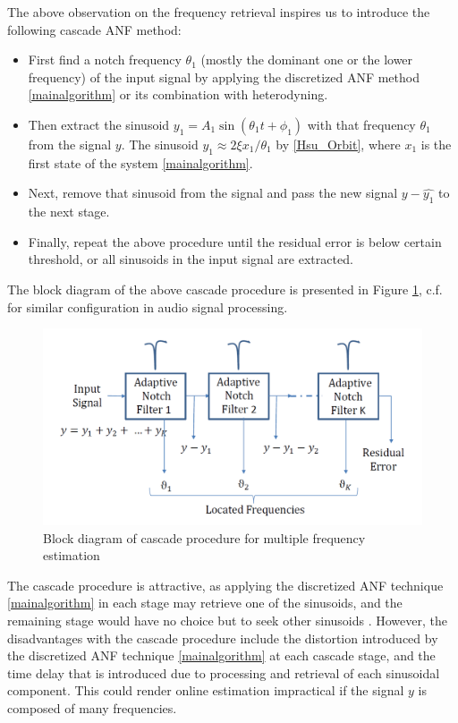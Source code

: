 \documentclass{UCF_ETD}
\begin{document}
 The  above observation on the frequency retrieval inspires us
  to introduce the following cascade ANF method:
  \begin{itemize}
  \item
  First  find a notch  frequency  $\theta_1$ (mostly the dominant one or the lower frequency)
  of the input signal
   by applying the discretized ANF  method \eqref{mainalgorithm}
  or its  combination with
  heterodyning.
  \item Then  extract the sinusoid $ y_1=A_1\sin (\theta_1 t+\phi_1)$  with that frequency $\theta_1$
 from the signal $y$. The sinusoid $y_1\approx 2 \xi x_1/\theta_1$ by \eqref{Hsu_Orbit},
  where   $x_1$ is the first state of the  system \eqref{mainalgorithm}.
 \item Next, remove that sinusoid from the signal and pass the new signal $y-\hat{y_1}$ to the next stage.

  \item Finally, repeat the above procedure until the residual error is below certain threshold,
  or all sinusoids in the input signal
  are extracted.
  \end{itemize}
    The block diagram
  of the  above  cascade procedure
   is  presented in  Figure \ref{cascadeblockdiagram.fig},  c.f.  \cite{Klapuri03}
  for similar configuration in audio signal processing.
  
  \begin{figure}[H]
  \begin{center}
  \includegraphics[scale=0.6]{NonuniformANF/Cascade}
  \caption{Block diagram of cascade procedure for multiple frequency estimation}
  \label{cascadeblockdiagram.fig}
  \end{center}
  \end{figure}
  
  
The cascade procedure is attractive, as applying the discretized ANF technique \eqref{mainalgorithm} in each stage may retrieve one of the sinusoids,
   and the remaining stage would have no choice but to seek other sinusoids \cite{regalia95}.
 However, the disadvantages with the cascade  procedure
  include the distortion introduced by the discretized ANF technique \eqref{mainalgorithm} at each cascade stage,
      and the time delay that is introduced due to processing and retrieval of each sinusoidal component.
       This could render online estimation
  impractical if the signal $y$ is composed of many frequencies. %
\end{document}
